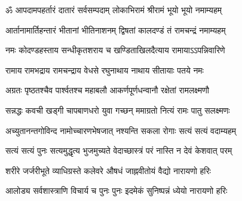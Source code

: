 
\twolineshloka
{ॐ आपदामपहर्तारं दातारं सर्वसम्पदाम्}
{लोकाभिरामं श्रीरामं भूयो भूयो नमाम्यहम्}

\twolineshloka
{आर्तानामार्तिहन्तारं भीतानां भीतिनाशनम्}
{द्विषतां कालदण्डं तं रामचन्द्रं नमाम्यहम्}

\twolineshloka
{नमः कोदण्डहस्ताय सन्धीकृतशराय च}
{खण्डिताखिलदैत्याय रामायाऽऽपन्निवारिणे}

\twolineshloka
{रामाय रामभद्राय रामचन्द्राय वेधसे}
{रघुनाथाय नाथाय सीतायाः पतये नमः}

\twolineshloka
{अग्रतः पृष्ठतश्चैव पार्श्वतश्च महाबलौ}
{आकर्णपूर्णधन्वानौ रक्षेतां रामलक्ष्मणौ}

\twolineshloka
{सन्नद्धः कवची खड्गी चापबाणधरो युवा}
{गच्छन् ममाग्रतो नित्यं रामः पातु सलक्ष्मणः}

\twolineshloka
{अच्युतानन्तगोविन्द नामोच्चारणभेषजात्}
{नश्यन्ति सकला रोगाः सत्यं सत्यं वदाम्यहम्}

\twolineshloka
{सत्यं सत्यं पुनः सत्यमुद्धृत्य भुजमुच्यते}
{वेदाच्छास्त्रं परं नास्ति न देवं केशवात् परम्}

\twolineshloka
{शरीरे जर्जरीभूते व्याधिग्रस्ते कलेवरे}
{औषधं जाह्नवीतोयं वैद्यो नारायणो हरिः}

\twolineshloka
{आलोड्य सर्वशास्त्राणि विचार्य च पुनः पुनः}
{इदमेकं सुनिष्पन्नं ध्येयो नारायणो हरिः}

